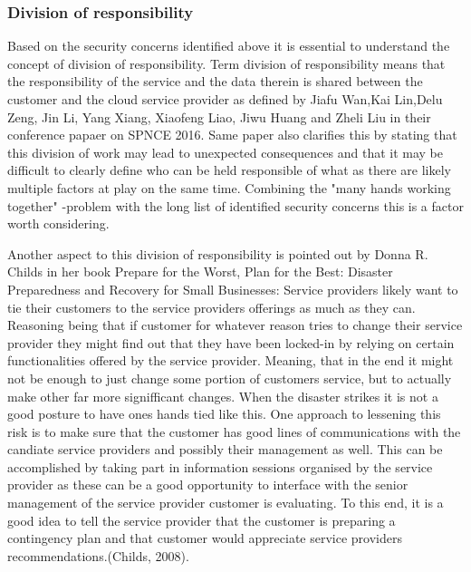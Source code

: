 \documentclass{article}
\begin{document}
\subsubsection{Division of responsibility}
Based on the security concerns identified above it is essential to understand the concept of division of responsibility.
Term division of responsibility means that the responsibility of the service and the data therein is shared between the customer and the cloud service provider as defined by Jiafu Wan,Kai Lin,Delu Zeng, Jin Li, Yang Xiang, Xiaofeng Liao, Jiwu Huang and Zheli Liu in their conference papaer on SPNCE 2016.
Same paper also clarifies this by stating that this division of work may lead to unexpected consequences and that it may be difficult to clearly define who can be held responsible of what as there are likely multiple factors at play on the same time.
Combining the "many hands working together" -problem with the long list of identified security concerns this is a factor worth considering.
\par
Another aspect to this division of responsibility is pointed out by Donna R. Childs in her book Prepare for the Worst, Plan for the Best: Disaster Preparedness and Recovery for Small Businesses: 
Service providers likely want to tie their customers to the service providers offerings as much as they can. Reasoning being that if customer for whatever reason tries to change their service provider they might find out that they have been locked-in by relying on certain functionalities offered by the service provider. Meaning, that in the end it might not be enough to just change some portion of customers service, but to actually make other far more signifficant changes. When the disaster strikes it is not a good posture to have ones hands tied like this. One approach to lessening this risk is to make sure that the customer has good lines of communications with the candiate service providers and possibly their management as well. This can be accomplished by taking part in information sessions organised by the service provider as these can be a good opportunity to interface with the senior management of the service provider customer is evaluating. To this end, it is a good idea to tell the service provider that the customer is preparing a contingency plan and that customer would appreciate service providers recommendations.(Childs, 2008). 
\par
\end{document}

